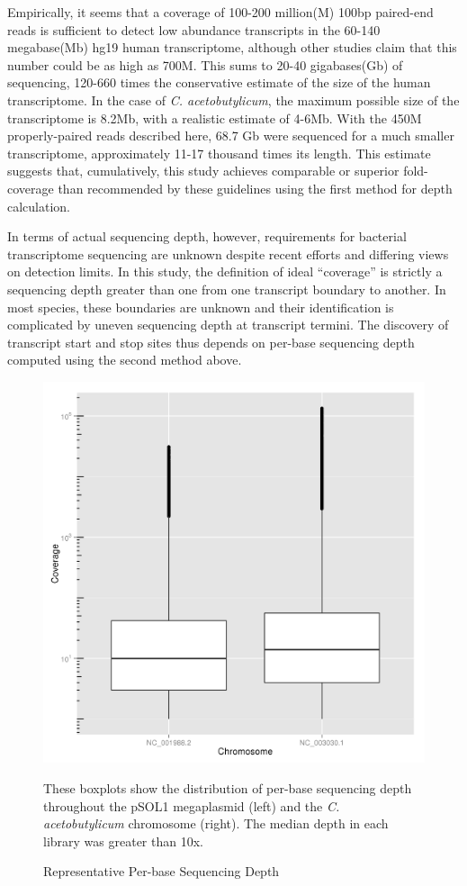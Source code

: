 Empirically, it seems that a coverage of 100-200 million(M) 100bp paired-end reads is sufficient to detect low abundance transcripts in the 60-140 megabase(Mb) hg19 human transcriptome,\cite{110} although other studies claim that this number could be as high as 700M.\cite{185} This sums to 20-40 gigabases(Gb) of sequencing, 120-660 times the conservative estimate of the size of the human transcriptome. In the case of \textit{C. acetobutylicum}, the maximum possible size of the transcriptome is 8.2Mb, with a realistic estimate of 4-6Mb. With the 450M properly-paired reads described here, 68.7 Gb were sequenced for a much smaller transcriptome, approximately 11-17 thousand times its length. This estimate suggests that, cumulatively, this study achieves comparable or superior fold-coverage than recommended by these guidelines using the first method for depth calculation. 

In terms of actual sequencing depth, however, requirements for bacterial transcriptome sequencing are unknown despite recent efforts\cite{108,109,110,176,177} and differing views on detection limits.\cite{176,186} In this study, the definition of ideal ``coverage'' is strictly a sequencing depth greater than one from one transcript boundary to another. In most species, these boundaries are unknown and their identification is complicated by uneven sequencing depth at transcript termini.\cite{18} The discovery of transcript start and stop sites thus depends on per-base sequencing depth computed using the second method above.
\begin{figure}
\includegraphics[width=\textwidth]{images/Sequencing/Supplemental/BA-A-75+boxplot.png}
\caption{Representative Per-base Sequencing Depth}\label{fig:4.5}
These boxplots show the distribution of per-base sequencing depth throughout the pSOL1 megaplasmid (left) and the \textit{C. acetobutylicum} chromosome (right). The median depth in each library was greater than 10x.
\end{figure}

